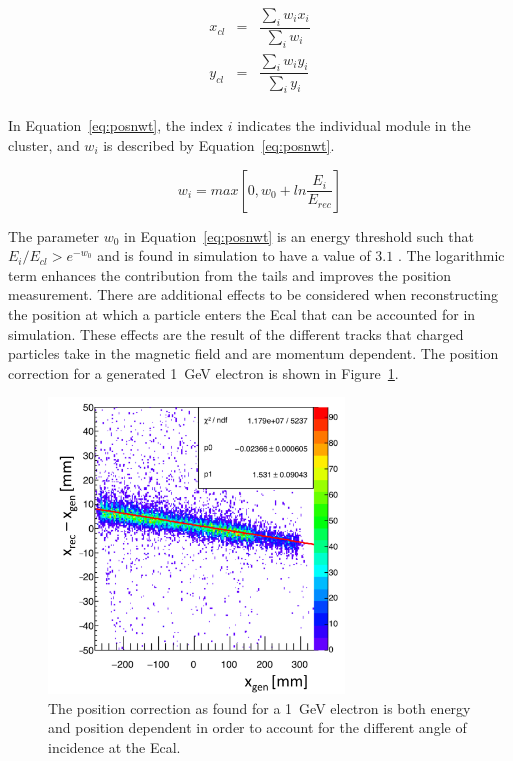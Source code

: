 \begin{eqnarray*}
\label{eq:posncalc}
x_{cl} & = & \dfrac{\sum_i w_i x_i}{\sum_i w_i}\\
y_{cl} & = & \dfrac{\sum_i w_i y_i}{\sum_i y_i}\\
\end{eqnarray*}

In Equation~\eqref{eq:posnwt}, the index $i$ indicates the individual module in the cluster, and $w_i$ is described by Equation~\eqref{eq:posnwt}.

\begin{equation}
\label{eq:posnwt}
w_i  =  max[0, w_0+ ln\dfrac{E_i}{E_{rec}}]
\end{equation}

The parameter $w_0$ in Equation~\eqref{eq:posnwt} is an energy threshold such that $E_i/E_{cl} > e^{-w_0}$ and is found in simulation to have a value of $3.1$ \cite{Garcon}. The logarithmic term enhances the contribution from the tails and improves the position measurement. There are additional effects to be considered when reconstructing the position at which a particle enters the Ecal that can be accounted for in simulation. These effects are the result of the different tracks that charged particles take in the magnetic field and are momentum dependent. The position correction for a generated 1~GeV electron is shown in Figure~\ref{Figure:xposn1gev}.

\begin{figure}[H]
  \centering
      \includegraphics[width=0.7\textwidth]{pics/performance/xposn1gev.png}
  \caption[Horizontal position correction for 1~GeV electrons]{The position correction as found for a 1~GeV electron is both energy and position dependent in order to account for the different angle of incidence at the Ecal.}
  \label{Figure:xposn1gev}
\end{figure}

